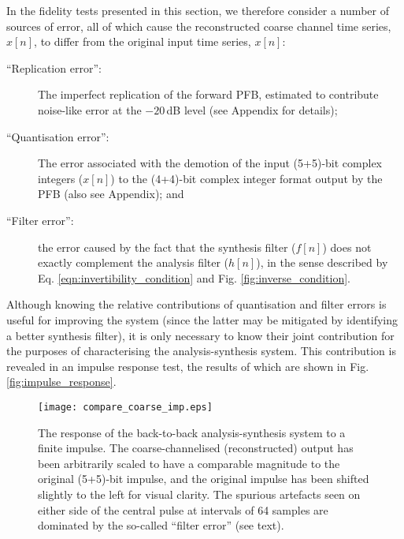 \documentclass{pasa}%
\begin{document}
In the fidelity tests presented in this section, we therefore consider a number of sources of error, all of which cause the reconstructed coarse channel time series, $\hat{x}[n]$, to differ from the original input time series, $x[n]$:
\begin{description}
    \item[``Replication error'':] The imperfect replication of the forward PFB, estimated to contribute noise-like error at the $-20\,$dB level (see Appendix for details);
    \item[``Quantisation error'':] The error associated with the demotion of the input (5+5)-bit complex integers ($x[n]$) to the (4+4)-bit complex integer format output by the PFB (also see Appendix); and
    \item[``Filter error'':] the error caused by the fact that the synthesis filter ($f[n]$) does not exactly complement the analysis filter ($h[n]$), in the sense described by Eq. \eqref{eqn:invertibility_condition} and Fig. \ref{fig:inverse_condition}.
\end{description}
Although knowing the relative contributions of quantisation and filter errors is useful for improving the system (since the latter may be mitigated by identifying a better synthesis filter), it is only necessary to know their joint contribution for the purposes of characterising the analysis-synthesis system.
This contribution is revealed in an impulse response test, the results of which are shown in Fig. \eqref{fig:impulse_response}.
\begin{figure}
    \centering
    \texttt{[image: compare\_coarse\_imp.eps]}
    \caption{The response of the back-to-back analysis-synthesis system to a finite impulse. The coarse-channelised (reconstructed) output has been arbitrarily scaled to have a comparable magnitude to the original (5+5)-bit impulse, and the original impulse has been shifted slightly to the left for visual clarity. The spurious artefacts seen on either side of the central pulse at intervals of 64 samples are dominated by the so-called ``filter error'' (see text).}
    \label{fig:impulse_response}
\end{figure}
\end{document}

